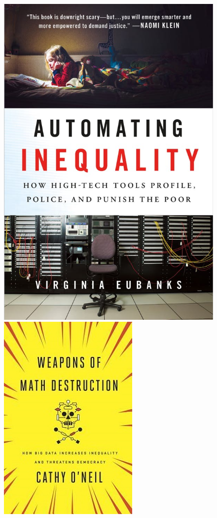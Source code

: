 \begin{frame}
  \begin{figure}
    \includegraphics[height=0.8\textheight]{fig/Automating-Inequality.jpg}
    \hspace{2em}
    \includegraphics[height=0.8\textheight]{fig/Weapons-of-Math-Destruction.jpg}
  \end{figure}
\end{frame}


